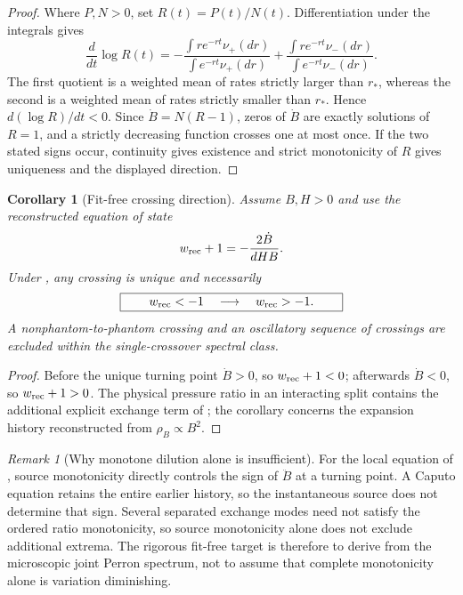 \documentclass[11pt]{article}
\newtheorem{corollary}[theorem]{Corollary}
\theoremstyle{definition}
\theoremstyle{remark}
\newtheorem{remark}[theorem]{Remark}
\begin{document}
\begin{proof}
Where \(P,N>0\), set \(R(t)=P(t)/N(t)\).  Differentiation under the integrals
gives
\[
 \frac{d}{dt}\log R(t)
 =-\frac{\int r e^{-rt}\nu_+(dr)}{\int e^{-rt}\nu_+(dr)}
  +\frac{\int r e^{-rt}\nu_-(dr)}{\int e^{-rt}\nu_-(dr)}.
\]
The first quotient is a weighted mean of rates strictly larger than \(r_*\),
whereas the second is a weighted mean of rates strictly smaller than \(r_*\).
Hence \(d(\log R)/dt<0\).  Since
\(\dot B=N(R-1)\), zeros of \(\dot B\) are exactly solutions of \(R=1\), and a
strictly decreasing function crosses one at most once.  If the two stated signs
occur, continuity gives existence and strict monotonicity of \(R\) gives
uniqueness and the displayed direction.
\end{proof}

\begin{corollary}[Fit-free crossing direction]
\label{cor:fit-free-crossing-direction}
Assume \(B,H>0\) and use the reconstructed equation of state
\[
  w_{\rm rec}+1=-\frac{2\dot B}{dHB}.
\]
Under , any crossing is unique and necessarily
\[
  \boxed{\qquad w_{\rm rec}<-1\quad\longrightarrow\quad
  w_{\rm rec}>-1.\qquad}
\]
A nonphantom-to-phantom crossing and an oscillatory sequence of crossings are
excluded within the single-crossover spectral class.
\end{corollary}

\begin{proof}
Before the unique turning point \(\dot B>0\), so
\(w_{\rm rec}+1<0\); afterwards \(\dot B<0\), so
\(w_{\rm rec}+1>0\).  The physical pressure ratio in an interacting
split contains the additional explicit exchange term of
; the corollary concerns the expansion
history reconstructed from \(\rho_B\propto B^2\).
\end{proof}

\begin{remark}[Why monotone dilution alone is insufficient]
\label{rem:monotone-source-not-enough}
For the local equation of , source
monotonicity directly controls the sign of \(\ddot B\) at a turning point.  A
Caputo equation retains the entire earlier history, so the instantaneous source
does not determine that sign.  Several separated exchange modes need not satisfy the ordered ratio
monotonicity, so source monotonicity alone does not exclude additional extrema.  The rigorous fit-free target is therefore to
derive  from the microscopic joint Perron
spectrum, not to assume that complete monotonicity alone is variation
diminishing.
\end{remark}
\end{document}
